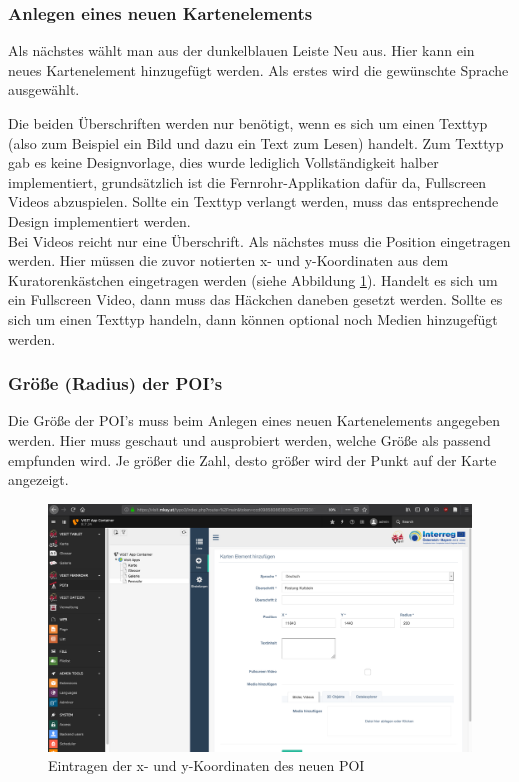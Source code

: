 \subsubsection{Anlegen eines neuen Kartenelements}

Als nächstes wählt man aus der dunkelblauen Leiste \glqq Neu\grqq{} aus. Hier kann ein neues Kartenelement hinzugefügt werden. Als erstes wird die gewünschte Sprache ausgewählt.

Die beiden Überschriften werden nur benötigt, wenn es sich um einen Texttyp (also zum Beispiel ein Bild und dazu ein Text zum Lesen) handelt. Zum Texttyp gab es keine Designvorlage, dies wurde lediglich Vollständigkeit halber implementiert, grundsätzlich ist die Fernrohr-Applikation dafür da, Fullscreen Videos abzuspielen. Sollte ein Texttyp verlangt werden, muss das entsprechende Design implementiert werden.\\
Bei Videos reicht nur eine Überschrift. Als nächstes muss die Position eingetragen werden. Hier müssen die zuvor notierten x- und y-Koordinaten aus dem Kuratorenkästchen eingetragen werden (siehe Abbildung \ref{img:fernrohr_x_u_y_koordinaten}). Handelt es sich um ein Fullscreen Video, dann muss das Häckchen daneben gesetzt werden. Sollte es sich um einen Texttyp handeln, dann können optional noch Medien hinzugefügt werden.

\subsubsection{Größe (Radius) der POI's}

Die Größe der POI's muss beim Anlegen eines neuen Kartenelements angegeben werden. Hier muss geschaut und ausprobiert werden, welche Größe als passend empfunden wird. Je größer die Zahl, desto größer wird der Punkt auf der Karte angezeigt.

\begin{figure}[ht!]
\centering
\includegraphics[width=12cm]{Figures/paula/fernrohr/fernrohr_x_u_y_koordinaten.png}
\caption{Eintragen der x- und y-Koordinaten des neuen POI}
\label{img:fernrohr_x_u_y_koordinaten}
\end{figure}


